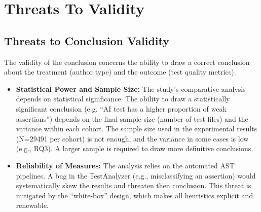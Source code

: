 \documentclass[conference]{IEEEtran}
\begin{document}

\section{Threats To Validity}
\label{Section:Threats}
\subsection{Threats to Conclusion Validity}
The validity of the conclusion concerns the ability to draw a correct conclusion about the treatment (author type) and the outcome (test quality metrics).
    \begin{itemize}
        \item \textbf{Statistical Power and Sample Size:} The study's comparative analysis depends on statistical significance. The ability to draw a statistically significant conclusion (e.g. ``AI test has a higher proportion of weak assertions'') depends on the final sample size (number of test files) and the variance within each cohort. The sample size used in the experimental results (N=29491 per cohort) is not enough, and the variance in some cases is low (e.g., RQ3). A larger sample is required to draw more definitive conclusions.
        \item \textbf{Reliability of Measures:} The analysis relies on the automated AST pipelines. A bug in the TestAnalyzer (e.g., misclassifying an assertion) would systematically skew the results and threaten then conclusion. This threat is mitigated by the ``white-box'' design, which makes all heuristics explicit and renewable.
    \end{itemize}
\end{document}
